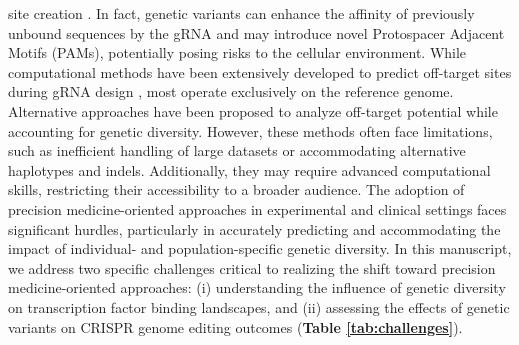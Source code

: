 \documentclass[a4paper, titlepage, openright]{book}
\begin{document}
site creation \citep{scott2017implications}. In fact, genetic variants can enhance the affinity of previously unbound sequences by the gRNA and may introduce novel Protospacer Adjacent Motifs (PAMs), potentially posing risks to the cellular environment. While computational methods have been extensively developed to predict off-target sites during gRNA design \citep{hanna2020design}, most operate exclusively on the reference genome. Alternative approaches have been proposed to analyze off-target potential while accounting for genetic diversity. However, these methods often face limitations, such as inefficient handling of large datasets or accommodating alternative haplotypes and indels. Additionally, they may require advanced computational skills, restricting their accessibility to a broader audience. The adoption of precision medicine-oriented approaches in experimental and clinical settings faces significant hurdles, particularly in accurately predicting and accommodating the impact of individual- and population-specific genetic diversity. In this manuscript, we address two specific challenges critical to realizing the shift toward precision medicine-oriented approaches: (i) understanding the influence of genetic diversity on transcription factor binding landscapes, and (ii) assessing the effects of genetic variants on CRISPR genome editing outcomes (\textbf{Table \ref{tab:challenges}}).
%
\end{document}
